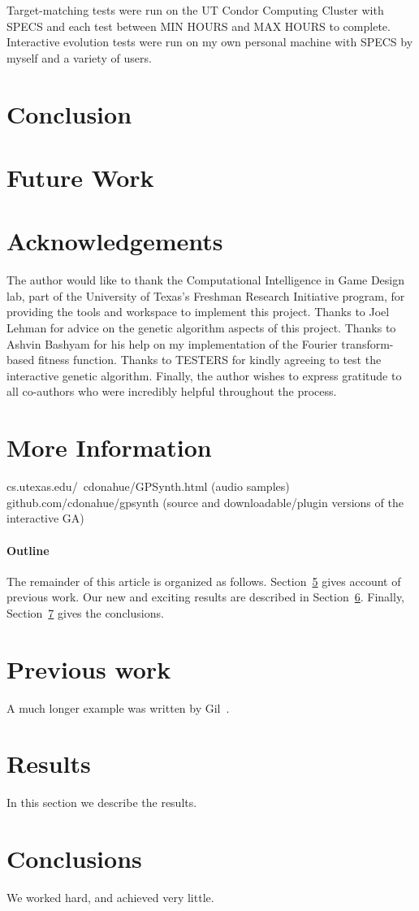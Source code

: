 \documentclass[12pt]{article}
\begin{document}
Target-matching tests were run on the UT Condor Computing Cluster with SPECS and each test between MIN HOURS and MAX HOURS to complete. Interactive evolution tests were run on my own personal machine with SPECS by myself and a variety of users.

\section{Conclusion}

\section{Future Work}

\section{Acknowledgements}
The author would like to thank the Computational Intelligence in Game Design lab, part of the University of Texas's Freshman Research Initiative program, for providing the tools and workspace to implement this project. Thanks to Joel Lehman for advice on the genetic algorithm aspects of this project. Thanks to Ashvin Bashyam for his help on my implementation of the Fourier transform-based fitness function. Thanks to TESTERS for kindly agreeing to test the interactive genetic algorithm. Finally, the author wishes to express gratitude to all co-authors who were incredibly helpful throughout the process.

\section{More Information}
cs.utexas.edu/~cdonahue/GPSynth.html (audio samples)
github.com/cdonahue/gpsynth (source and downloadable/plugin versions of the interactive GA)

\paragraph{Outline}
The remainder of this article is organized as follows.
Section~\ref{previous work} gives account of previous work.
Our new and exciting results are described in Section~\ref{results}.
Finally, Section~\ref{conclusions} gives the conclusions.

\section{Previous work}\label{previous work}
A much longer \LaTeXe{} example was written by Gil~\cite{Gil:02}.

\section{Results}\label{results}
In this section we describe the results.

\section{Conclusions}\label{conclusions}
We worked hard, and achieved very little.



\end{document}
